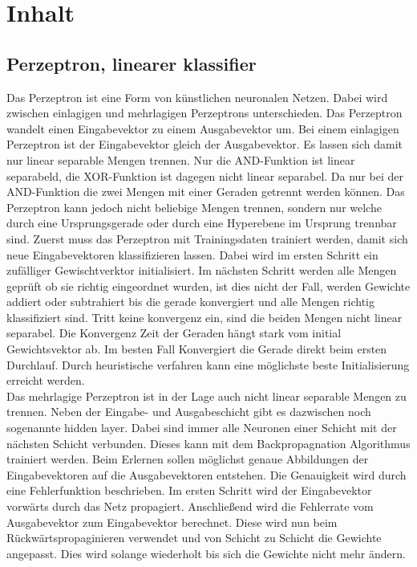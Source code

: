 \section{Inhalt}
\subsection{Perzeptron, linearer klassifier}
Das Perzeptron ist eine Form von künstlichen neuronalen Netzen. Dabei wird zwischen einlagigen und mehrlagigen Perzeptrons unterschieden.  Das Perzeptron wandelt einen Eingabevektor zu einem Ausgabevektor um. Bei einem einlagigen Perzeptron ist der Eingabevektor gleich der Ausgabevektor. Es lassen sich damit nur linear separable Mengen trennen. Nur die AND-Funktion ist linear separabeld, die XOR-Funktion ist dagegen nicht linear separabel. Da nur bei der AND-Funktion die zwei Mengen mit einer Geraden getrennt werden können. Das Perzeptron kann jedoch nicht beliebige Mengen trennen, sondern nur welche durch eine Ursprungsgerade oder durch eine Hyperebene im Ursprung trennbar sind. Zuerst muss das Perzeptron mit Trainingsdaten trainiert werden, damit sich neue Eingabevektoren klassifizieren lassen. Dabei wird im ersten Schritt ein zufälliger Gewischtverktor initialisiert. Im nächsten Schritt werden alle Mengen geprüft ob sie richtig eingeordnet wurden, ist dies nicht der Fall, werden Gewichte addiert oder subtrahiert bis die gerade konvergiert und alle Mengen richtig klassifiziert sind. Tritt keine konvergenz ein, sind die beiden Mengen nicht linear separabel. Die Konvergenz Zeit der Geraden hängt stark vom initial Gewichtsvektor ab. Im besten Fall Konvergiert die Gerade direkt beim ersten Durchlauf. Durch heuristische verfahren kann eine möglichste beste Initialisierung erreicht werden. 
\\
Das mehrlagige Perzeptron ist in der Lage auch nicht linear separable Mengen zu trennen. Neben der Eingabe- und Ausgabeschicht gibt es dazwischen noch sogenannte hidden layer. Dabei sind immer alle Neuronen einer Schicht mit der nächsten Schicht verbunden. Dieses kann mit dem Backpropagnation Algorithmus trainiert werden. Beim Erlernen sollen möglichst genaue Abbildungen der Eingabevektoren auf die Ausgabevektoren entstehen. Die Genauigkeit wird durch eine Fehlerfunktion beschrieben.  Im ersten Schritt wird der Eingabevektor vorwärts durch das Netz propagiert. Anschließend wird die Fehlerrate vom Ausgabevektor zum Eingabevektor berechnet.  Diese wird nun beim Rückwärtspropaginieren verwendet und von Schicht zu Schicht die Gewichte angepasst. Dies wird solange wiederholt bis sich die Gewichte nicht mehr ändern. 

